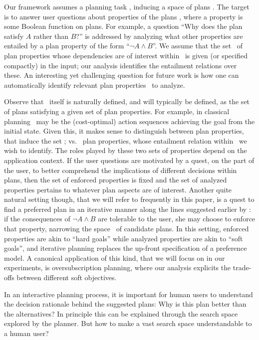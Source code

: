 Our framework assumes a planning task \task, inducing a space of plans
\plans. The target is to answer user questions about properties of the
plans \plans, where a property is some Boolean function on plans. For
example, a question ``Why does the plan satisfy $A$ rather than $B$?''
is addressed by analyzing what other properties are entailed by a plan
property of the form ``$\neg A \wedge B$''. We assume that the set
\props\ of plan properties whose dependencies are of interest within
\plans\ is given (or specified compactly) in the input; our analysis
identifies the entailment relations over these. An interesting yet
challenging question for future work is how one can automatically
identify relevant plan properties \props\ to analyze.

Observe that \plans\ itself is naturally defined, and will typically
be defined, as the set of plans satisfying a given set of plan
properties. For example, in classical planning \plans\ may be the
(cost-optimal) action sequences achieving the goal from the initial
state. Given this, it makes sense to distinguish between
 plan properties, that induce the set \plans;
vs.\  plan properties, whose entailment relation
within \plans\ we wish to identify. The roles played by these two sets
of properties depend on the application context. If the user questions
are motivated by a quest, on the part of the user, to better
comprehend the implications of different decisions within plans, then
the set of enforced properties is fixed and the set of analyzed
properties pertains to whatever plan aspects are of interest. Another
quite natural setting though, that we will refer to frequently in this
paper, is a quest to find a preferred plan in an iterative manner
along the lines suggested earlier by \cite{smith:aaai-12}: if the
consequences of $\neg A \wedge B$ are tolerable to the user, she may
choose to enforce that property, narrowing the space \plans\ of
candidate plans. In this setting, enforced properties are akin to
``hard goals'' while analyzed properties are akin to ``soft goals'',
and iterative planning replaces the up-front specification of a
preference model. A canonical application of this kind, that we will
focus on in our experiments, is oversubscription planning, where our
analysis explicits the trade-offs between different soft objectives.








%
In an interactive planning process, it is important for human users to
understand the decision rationale behind the suggested plans: Why is
this plan better than the alternatives?  In principle this can be
explained through the search space explored by the planner.  But how
to make a vast search space understandable to a human user? 
